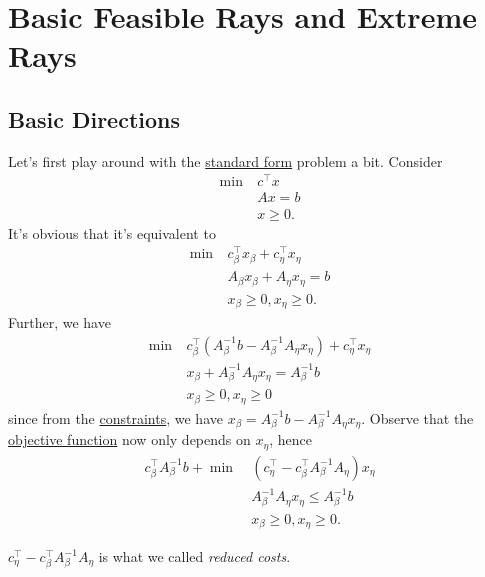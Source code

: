 \section{Basic Feasible Rays and Extreme Rays}
\subsection{Basic Directions}
Let's first play around with the \hyperref[def:standard-form]{standard form} problem a bit. Consider
\[
	\begin{aligned}
		\min~ & c^{\top}x \\
		      & Ax = b    \\
		      & x\geq 0.
	\end{aligned}
\]
It's obvious that it's equivalent to
\[
	\begin{aligned}
		\min~ & c^{\top}_{\beta}x_{\beta} + c^{\top}_{\eta}x_{\eta} \\
		      & A_{\beta}x_{\beta} + A_{\eta}x_{\eta} = b           \\
		      & x_{\beta}\geq 0, x_{\eta}\geq 0.
	\end{aligned}
\]
Further, we have
\[
	\begin{aligned}
		\min~ & c^{\top}_{\beta}(A^{-1}_{\beta}b - A^{-1}_{\beta}A_{\eta}x_{\eta} ) + c_{\eta}^{\top}x_{\eta} \\
		      & x_{\beta} + A^{-1}_{\beta}A_{\eta}x_{\eta} = A^{-1}_{\beta}b                                  \\
		      & x_{\beta}\geq 0, x_{\eta}\geq 0
	\end{aligned}
\]
since from the \hyperref[def:constraint]{constraints}, we have \(x_{\beta} = A^{-1}_{\beta}b - A^{-1}_{\beta}A_{\eta}x_{\eta}\). Observe that the \hyperref[def:objective-function]{objective function} now only depends on \(x_{\eta}\), hence
\[
	\begin{aligned}
		c^{\top}_{\beta}A^{-1}_{\beta}b + \min~ & (c_{\eta}^{\top} - c_{\beta}^{\top}A^{-1}_{\beta}A_{\eta})x_{\eta} \\
		                                        & A^{-1}_{\beta}A_{\eta}x_{\eta} \leq A^{-1}_{\beta}b                \\
		                                        & x_{\beta}\geq 0, x_{\eta}\geq 0.
	\end{aligned}
\]

\begin{note}\label{note:reduced-cost}
	\(c_{\eta}^{\top} - c_{\beta}^{\top}A^{-1}_{\beta}A_{\eta}\) is what we called \emph{reduced costs}.
\end{note}

